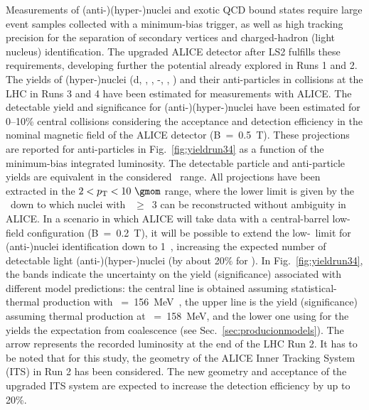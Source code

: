 Measurements of (anti-)(hyper-)nuclei and exotic QCD bound states require large event samples collected with a minimum-bias trigger, as well as high tracking precision for the separation of secondary vertices and charged-hadron (light nucleus) identification. The upgraded ALICE detector after LS2 \cite{Abelevetal:2014dna, ALICE:2014qrd,alice-up-trg,Buncic:2015ari} fulfills these requirements, developing further the potential already explored in Runs 1 and 2.
The yields of (hyper-)nuclei (d,  \hethree, \hefour, \hyp, \hypfour, \hyphefour) and their anti-particles in \PbPb collisions at the LHC in Runs 3 and 4 have been estimated for measurements with ALICE. 
The detectable yield and significance for (anti-)(hyper-)nuclei have been estimated for 0--10\% central \PbPb collisions considering the acceptance and detection efficiency in the nominal magnetic field of the ALICE detector (B~=~0.5~T).
These projections are reported for anti-particles in Fig.~\ref{fig:yieldrun34} as a function of the minimum-bias integrated luminosity. The detectable particle and anti-particle yields are equivalent in the considered \pT\ range. 
All projections have been extracted in the $2 <\pT< 10~\gmom$ range, where the lower limit is given by the \pT\ down to which nuclei with \Anucl~$\geq$~3 can be reconstructed without ambiguity in ALICE. 
In a scenario in which ALICE will take data with a central-barrel low-field configuration (B~=~0.2~T), it will be possible to extend the low-\pT\ limit for \mbox{(anti-)nuclei} identification down to 1~\gmom, increasing the expected number of detectable light \mbox{(anti-)(hyper-)nuclei} (by about 20$\%$ for \hethree). 
In Fig.~\ref{fig:yieldrun34}, the bands indicate the uncertainty on the yield (significance) associated with different model predictions:
the central line is obtained assuming statistical-thermal production with \Tchem~=~156~MeV~\cite{Andronic:2010qu}, the upper line is the yield (significance) assuming thermal production at \Tchem~=~158~MeV, and the lower one using for the yields the expectation from coalescence (see Sec.~\ref{sec:producionmodels}). 
The arrow represents the recorded luminosity at the end of the LHC Run 2. 
It has to be noted that for this study, the geometry of the ALICE Inner Tracking System (ITS) in Run 2 has been considered. 
The new geometry and acceptance of the upgraded ITS system \cite{Abelevetal:2014dna} are expected to increase the detection efficiency by up to 20\%.

